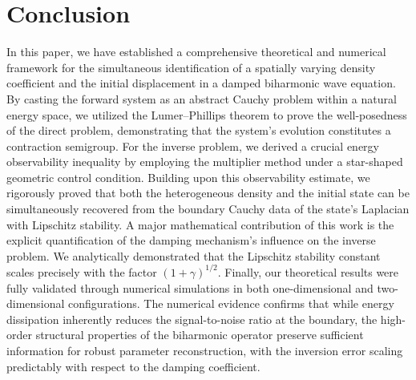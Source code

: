 \documentclass[12pt,reqno]{amsart}
\numberwithin{equation}{section}
\begin{document}
	\section{Conclusion}
	\label{sec6}
	In this paper, we have established a comprehensive theoretical and numerical framework for the simultaneous identification of a spatially varying density coefficient and the initial displacement in a damped biharmonic wave equation. 
	By casting the forward system as an abstract Cauchy problem within a natural energy space, we utilized the Lumer--Phillips theorem to prove the well-posedness of the direct problem, demonstrating that the system's evolution constitutes a contraction semigroup. For the inverse problem, we derived a crucial energy observability inequality by employing the multiplier method under a star-shaped geometric control condition. 
	Building upon this observability estimate, we rigorously proved that both the heterogeneous density and the initial state can be simultaneously recovered from the boundary Cauchy data of the state's Laplacian with Lipschitz stability. A major mathematical contribution of this work is the explicit quantification of the damping mechanism's influence on the inverse problem. We analytically demonstrated that the Lipschitz stability constant scales precisely with the factor $(1 + \gamma)^{1/2}$. 
	Finally, our theoretical results were fully validated through numerical simulations in both one-dimensional and two-dimensional configurations. The numerical evidence confirms that while energy dissipation inherently reduces the signal-to-noise ratio at the boundary, the high-order structural properties of the biharmonic operator preserve sufficient information for robust parameter reconstruction, with the inversion error scaling predictably with respect to the damping coefficient.
	
\end{document}
